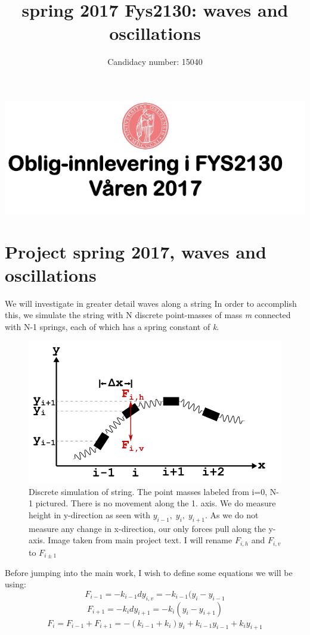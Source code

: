 \documentclass[12pt]{article}
\title{spring 2017 Fys2130: waves and oscillations}
\date{}
\author{Candidacy number: 15040}
\begin{document}
\maketitle
\includegraphics[scale=0.6]{UiOLogo}
\newpage
\section*{Project spring 2017, waves and oscillations}

We will investigate in greater detail waves along a string In order to accomplish this, we simulate the string with N discrete point-masses of mass \textit{m} connected with N-1 springs, each of which has a spring constant of \textit{k}.
\begin{figure}[hb]
	\includegraphics[scale=0.7]{DiscreteString.png}
	\caption{Discrete simulation of string. The point masses labeled from i=0, N-1
			pictured. There is no movement along the 1. axis. We do measure height in y-direction as
			seen with $y_{i-1},\; y_i,\; y_{i+1}$. As we do not measure any change in x-direction, our 
			only forces pull along the y-axis. Image taken from main project text. I will rename 
			$F_{i,h}$ and $F_{i, v}$ to $F_{i\pm1}$}
\end{figure}
Before jumping into the main work, I wish to define some equations we will be using:
$$ F_{i-1} = -k_{i-1}dy_{i,v} = -k_{i-1}(y_i - y_{i-1} $$
$$ F_{i+1} = -k_i dy_{i+1} = -k_i(y_i - y_{i+1})$$
\begin{equation}
\begin{aligned}
F_i = F_{i-1} + F_{i+1} = -(k_{i-1} + k_i)y_i + k_{i-1}y_{i-1} + k_iy_{i+1}
\end{aligned}
\end{equation}
\end{document}
